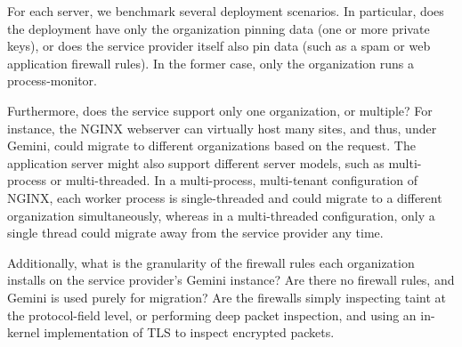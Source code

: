 For each server, we benchmark several deployment scenarios.
%
In particular, does the deployment have only the organization pinning data (one
or more private keys), or does the service provider itself also pin data (such
as a spam or web application firewall rules).
%
In the former case, only the organization runs a process-monitor.


Furthermore, does the service support only one organization, or multiple?
%
For instance, the NGINX webserver can virtually host many sites, and thus,
under Gemini, could migrate to different organizations based on the request.
%
The application server might also support different server models, such as
multi-process or multi-threaded.
%
In a multi-process, multi-tenant configuration of NGINX, each worker process
is single-threaded and could migrate to a different organization
simultaneously, whereas in a multi-threaded configuration, only a single thread
could migrate away from the service provider any time.


Additionally, what is the granularity of the firewall rules each organization
installs on the service provider's Gemini instance?
%
Are there no firewall rules, and Gemini is used purely for migration?
%
Are the firewalls simply inspecting taint at the protocol-field level, or
performing deep packet inspection, and using an in-kernel
implementation of TLS to inspect encrypted packets. 



